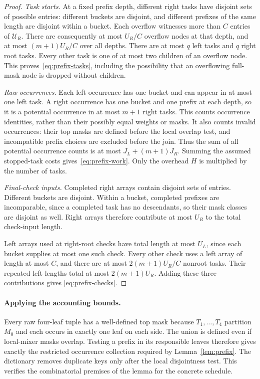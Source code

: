 \begin{proof}
\emph{Task starts.}
At a fixed prefix depth, different right tasks have disjoint sets of
possible entries: different buckets are disjoint, and different
prefixes of the same length are disjoint within a bucket. Each
overflow witnesses more than $C$ entries of $\mathcal U_R$.
There are consequently at most $U_R/C$ overflow nodes at that depth,
and at most $(m+1)U_R/C$ over all depths. There are at most $q$ left
tasks and $q$ right root tasks. Every other task is one of at most two
children of an overflow node. This proves~\eqref{eq:prefix-tasks},
including the possibility that an overflowing full-mask node is
dropped without children.

\emph{Raw occurrences.}
Each left occurrence has one bucket and can appear in at most one
left task. A right occurrence has one bucket and one prefix at each
depth, so it is a potential occurrence in at most $m+1$ right tasks.
This counts occurrence identities, rather than their possibly equal
weights or masks. It also counts invalid occurrences: their top masks
are defined before the local overlap test, and incompatible prefix
choices are excluded before the join. Thus the sum of all potential
occurrence counts is at most $J_L+(m+1)J_R$. Summing the assumed
stopped-task costs gives~\eqref{eq:prefix-work}. Only the overhead
$H$ is multiplied by the number of tasks.

\emph{Final-check inputs.}
Completed right arrays contain disjoint sets of entries. Different
buckets are disjoint. Within a bucket, completed prefixes are
incomparable, since a completed task has no descendants, so their
mask classes are disjoint as well. Right arrays therefore contribute
at most $U_R$ to the total check-input length.

Left arrays used at right-root checks have total length at most $U_L$,
since each bucket supplies at most one such check. Every other check
uses a left array of length at most $C$, and there are at most
$2(m+1)U_R/C$ nonroot tasks. Their repeated left lengths total at most
$2(m+1)U_R$. Adding these three contributions gives
\eqref{eq:prefix-checks}.
\end{proof}

\paragraph{Applying the accounting bounds.}
Every raw four-leaf tuple has a well-defined top mask because
$T_1,\ldots,T_4$ partition $M_0$ and each occurs in exactly one leaf
on each side. The union is defined even if local-mixer masks overlap.
Testing a prefix in its responsible leaves therefore gives exactly
the restricted occurrence collection required by Lemma~\ref{lem:prefix}.
The dictionary removes duplicate keys only after the local
disjointness test. This verifies the combinatorial premises of the
lemma for the concrete schedule.

